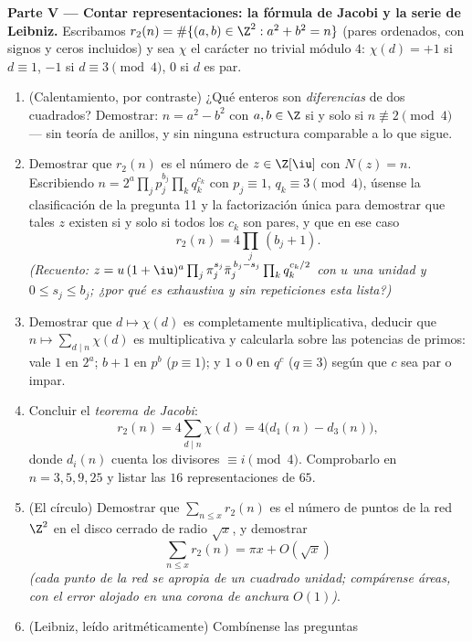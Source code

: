 \begin{problem}
\medskip
\noindent\textbf{Parte V --- Contar representaciones: la fórmula de
Jacobi y la serie de Leibniz.} Escribamos $r_2(n) = \#\{(a, b) \in
\Z^2 : a^2 + b^2 = n\}$ (pares ordenados, con signos y ceros incluidos)
y sea $\chi$ el carácter no trivial módulo $4$: $\chi(d) = +1$ si
$d \equiv 1$, $-1$ si $d \equiv 3 \pmod4$, $0$ si $d$ es par.
\begin{enumerate}[resume]
  \item (Calentamiento, por contraste) ¿Qué enteros son
  \emph{diferencias} de dos cuadrados? Demostrar: $n = a^2 - b^2$ con
  $a, b \in \Z$ si y solo si $n \not\equiv 2 \pmod 4$ --- sin teoría de
  anillos, y sin ninguna estructura comparable a lo que sigue. \item
  Demostrar que $r_2(n)$ es el número de $z \in \Z[\iu]$ con $N(z) = n$.
  Escribiendo $n = 2^{a}\prod_jp_j^{b_j}
        \prod_kq_k^{c_k}$ con $p_j \equiv 1$, $q_k \equiv 3
        \pmod4$, úsense la clasificación de la pregunta 11 y la
  factorización única para demostrar que tales $z$ existen si y solo si
  todos los $c_k$ son pares, y que en ese caso
        \[
        r_2(n) = 4\prod_j\,(b_j + 1) .
        \]
        \emph{(Recuento: $z = u\,(1+\iu)^{a}\prod_j\pi_j^{s_j}
        \bar\pi_j^{\,b_j - s_j}\prod_kq_k^{c_k/2}$ con $u$ una unidad y
        $0 \leq s_j \leq b_j$; ¿por qué es exhaustiva y sin repeticiones
        esta lista?)} \item Demostrar que $d \mapsto \chi(d)$ es
        completamente multiplicativa, deducir que $n \mapsto
        \sum_{d \mid n}\chi(d)$ es multiplicativa y calcularla sobre las
        potencias de primos: vale $1$ en $2^a$; $b + 1$ en $p^b$
        ($p \equiv 1$); y $1$ o $0$ en $q^c$ ($q \equiv 3$) según que
        $c$ sea par o impar. \item Concluir el \emph{teorema de Jacobi}:
        \[
        r_2(n) = 4\sum_{d \mid n}\chi(d) =
        4\bigl(d_1(n) - d_3(n)\bigr),
        \]
        donde $d_i(n)$ cuenta los divisores $\equiv i \pmod 4$.
        Comprobarlo en $n = 3, 5, 9, 25$ y listar las $16$
        representaciones de $65$. \item (El círculo) Demostrar que
        $\sum_{n \leq x}r_2(n)$ es el número de puntos de la red $\Z^2$
        en el disco cerrado de radio $\sqrt x$, y demostrar
        \[
        \sum_{n\leq x}r_2(n) = \pi x + O(\sqrt x)
        \]
        \emph{(cada punto de la red se apropia de un cuadrado unidad;
        compárense áreas, con el error alojado en una corona de anchura
        $O(1)$)}.
  \item (Leibniz, leído aritméticamente) Combínense las preguntas

\end{enumerate}
\end{problem}
